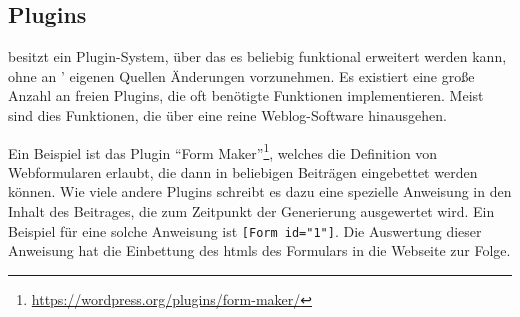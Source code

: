    \subsection{Plugins}
        \label{section:wordpressPlugins}
        {\wordpress} besitzt ein Plugin-System,
        über das es beliebig funktional erweitert werden kann,
        ohne an {\wordpress}' eigenen Quellen Änderungen vorzunehmen.
        Es existiert eine große Anzahl an freien Plugins,
        die oft benötigte Funktionen implementieren.
        Meist sind dies Funktionen, die über eine reine Weblog-Software hinausgehen.

        Ein Beispiel ist das Plugin
        "`Form Maker"'\footnote{\url{https://wordpress.org/plugins/form-maker/}},
        welches die Definition von Webformularen erlaubt,
        die dann in beliebigen Beiträgen eingebettet werden können.
        Wie viele andere Plugins schreibt es dazu eine spezielle Anweisung in den Inhalt des Beitrages,
        die zum Zeitpunkt der Generierung ausgewertet wird.
        Ein Beispiel für eine solche Anweisung ist \texttt{[Form id="1"]}.
        Die Auswertung dieser Anweisung hat die Einbettung des \glspl{html}
        des Formulars in die Webseite zur Folge.
